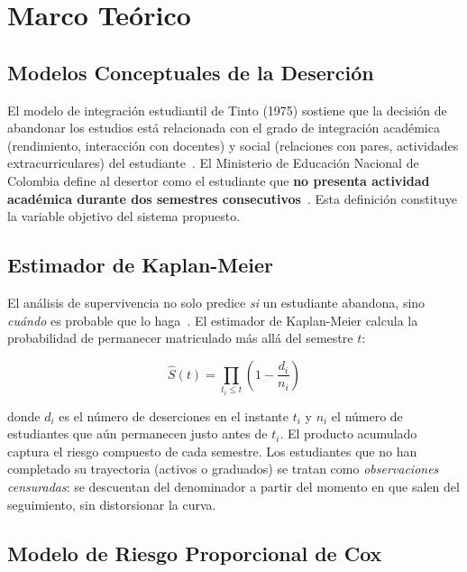 \documentclass[12pt]{article}
\begin{document}
\section{Marco Teórico}

\subsection{Modelos Conceptuales de la Deserción}

El modelo de integración estudiantil de Tinto (1975) sostiene que la decisión de
abandonar los estudios está relacionada con el grado de integración académica
(rendimiento, interacción con docentes) y social (relaciones con pares, actividades
extracurriculares) del estudiante~\cite{men2008}. El Ministerio de Educación Nacional de
Colombia define al desertor como el estudiante que \textbf{no presenta actividad
académica durante dos semestres consecutivos}~\cite{men2008}. Esta definición constituye
la variable objetivo del sistema propuesto.

\subsection{Estimador de Kaplan-Meier}

El análisis de supervivencia no solo predice \emph{si} un estudiante abandona, sino
\emph{cuándo} es probable que lo haga~\cite{men2008_cap4}. El estimador de Kaplan-Meier
calcula la probabilidad de permanecer matriculado más allá del semestre $t$:

\begin{equation}
    \hat{S}(t) = \prod_{t_i \leq t} \left(1 - \frac{d_i}{n_i}\right)
    \label{eq:km}
\end{equation}

donde $d_i$ es el número de deserciones en el instante $t_i$ y $n_i$ el número de
estudiantes que aún permanecen justo antes de $t_i$. El producto acumulado captura
el riesgo compuesto de cada semestre. Los estudiantes que no han completado su
trayectoria (activos o graduados) se tratan como \emph{observaciones censuradas}: se
descuentan del denominador a partir del momento en que salen del seguimiento, sin
distorsionar la curva.

\subsection{Modelo de Riesgo Proporcional de Cox}
\label{sec:cox}
\end{document}
